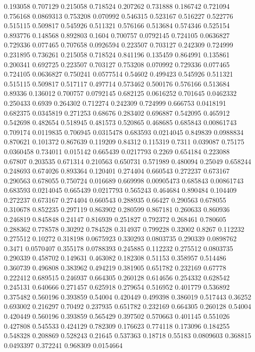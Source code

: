 0.193058 0.707129
0.215058 0.718524
0.207262 0.731888
0.186742 0.721094
0.756168 0.0869313
0.753208 0.070992
0.546315 0.523167
0.516227 0.522776
0.515115 0.509817
0.545926 0.511321
0.576166 0.513684
0.574346 0.525154
0.893776 0.148568
0.892803 0.1604
0.700757 0.0792145
0.724105 0.0636827
0.729336 0.077465
0.707658 0.0926594
0.223507 0.703127
0.242309 0.724999
0.231895 0.736261
0.215058 0.718524
0.841196 0.135459
0.864991 0.135861
0.200341 0.692725
0.223507 0.703127
0.753208 0.070992
0.729336 0.077465
0.724105 0.0636827
0.750241 0.0577514
0.54602 0.499423
0.545926 0.511321
0.515115 0.509817
0.517117 0.497714
0.573462 0.500176
0.576166 0.513684
0.89336 0.136012
0.700757 0.0792145
0.682125 0.0616252
0.701645 0.0462332
0.250433 0.6939
0.264302 0.712274
0.242309 0.724999
0.666753 0.0418191
0.682375 0.0345819
0.271253 0.68676
0.283402 0.696887
0.542095 0.465912
0.542698 0.482654
0.518945 0.481573
0.520865 0.468685
0.685843 0.00861743
0.709174 0.0119835
0.706945 0.0315478
0.683593 0.0214045
0.849839 0.0988834
0.870621 0.101372
0.867639 0.119209
0.84312 0.115319
0.7311 0.039087
0.75175 0.0360458
0.734011 0.015142
0.665439 0.0217793
0.2269 0.654184
0.223088 0.67807
0.203535 0.671314
0.210563 0.650731
0.571989 0.480094
0.25049 0.658244
0.248693 0.674026
0.893364 0.120401
0.274404 0.660543
0.272237 0.673167
0.290563 0.678055
0.750724 0.016689
0.669998 0.00905473
0.685843 0.00861743
0.683593 0.0214045
0.665439 0.0217793
0.565243 0.464684
0.890484 0.104409
0.272237 0.673167
0.274404 0.660543
0.288935 0.66427
0.290563 0.678055
0.310678 0.852235
0.297119 0.863902
0.280599 0.867181
0.260633 0.860936
0.246819 0.845848
0.24147 0.816939
0.251827 0.792372
0.268461 0.780605
0.288362 0.778578
0.30292 0.784528
0.314937 0.799228
0.32002 0.8267
0.112232 0.275512
0.10272 0.318198
0.0675923 0.330293
0.0803735 0.290339
0.0898762 0.3471
0.0570407 0.355178
0.0788393 0.245885
0.112232 0.275512
0.0803735 0.290339
0.458702 0.149631
0.463082 0.182308
0.51153 0.358957
0.514486 0.360739
0.496808 0.383962
0.494219 0.381905
0.651782 0.232169
0.67778 0.222412
0.689515 0.246937
0.664305 0.260128
0.614656 0.254332
0.628542 0.245131
0.640666 0.271457
0.625918 0.279654
0.516952 0.401779
0.536892 0.375482
0.560196 0.393859
0.54004 0.420449
0.499398 0.386019
0.517443 0.36252
0.693002 0.216297
0.70492 0.237935
0.651782 0.232169
0.664305 0.260128
0.54004 0.420449
0.560196 0.393859
0.565429 0.397502
0.570663 0.401145
0.551026 0.427808
0.545533 0.424129
0.782309 0.176623
0.774118 0.173096
0.184255 0.548328
0.208869 0.528243
0.21645 0.537363
0.18718 0.55183
0.0809603 0.368815
0.0493397 0.372241
0.968309 0.0154664
